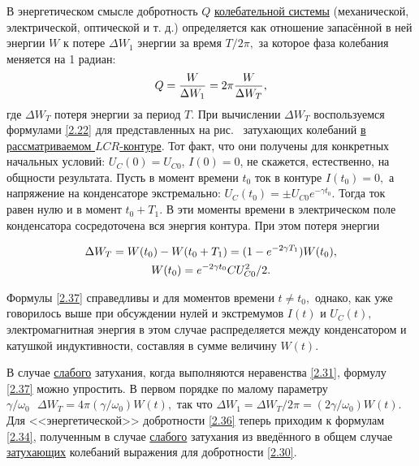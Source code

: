 В энергетическом смысле добротность $Q$ \underline{колебательной системы} (механической, электрической, оптической и т. д.) определяется как отношение запасённой в ней энергии $W$ к потере $\Delta W_1$ энергии за время $T/2\pi,$ за которое фаза колебания меняется на 1 радиан:
\begin{equation}\eqmark{2.36}
Q=\dfrac{W}{\Delta W_1}=2\pi\dfrac{W}{\Delta W_T},
\end{equation}
где  $\Delta W_T$ \important{--} потеря энергии за период $T.$ При вычислении $\Delta W_T$ воспользуемся формулами \eqref{2.22} для представленных на рис.~ затухающих колебаний \underline{в рассматриваемом $LCR$-контуре}. Тот факт, что они получены для конкретных начальных условий: $U_C(0)=U_{C0}$, $I(0)=0$, \important{--} не скажется, естественно, на общности результата. Пусть в момент времени $t_0$ ток в контуре $I(t_0)=0,$ а напряжение на конденсаторе экстремально: $U_C(t_0)=\pm U_{C0}e^{-\gamma t_0}.$ Тогда ток равен нулю и в момент $t_0+T_1.$ В эти моменты времени в электрическом поле конденсатора сосредоточена вся энергия контура. При этом потеря энергии

\begin{equation}
	\eqmark{2.37}
		\begin{gathered}[c]
			 \Delta W_T = W(t_0)-W(t_0+T_1)=(1-e^{-2\gamma T_1})W(t_0), \\
			 W(t_0) = e^{-2\gamma t_0}CU_{C0}^2/2.	
		\end{gathered}
\end{equation}

Формулы \eqref{2.37} справедливы и для моментов времени $t\ne t_0,$ однако, как уже говорилось выше при обсуждении нулей и экстремумов $I(t)$ и $U_C(t),$ электромагнитная энергия в этом случае распределяется между конденсатором и катушкой индуктивности, составляя в сумме величину $W(t).$

В случае \underline{слабого} затухания, когда выполняются неравенства \eqref{2.31}, формулу \eqref{2.37} можно упростить. В первом порядке по малому параметру $\gamma/\omega_0~~~\Delta W_T=4\pi(\gamma/\omega_0)W(t),$ так что $\Delta W_1=\Delta W_T/2\pi=(2\gamma/\omega_0)W(t).$ Для <<энергетической>> добротности \eqref{2.36} теперь приходим к формулам \eqref{2.34}, полученным в случае \underline{слабого} затухания из введённого в общем случае \underline{затухающих} колебаний выражения для добротности \eqref{2.30}.


